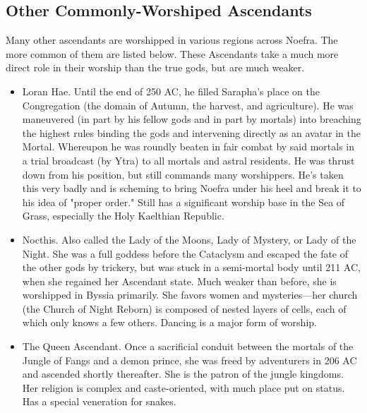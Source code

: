 \subsection{Other Commonly-Worshiped Ascendants}
Many other ascendants are worshipped in various regions across Noefra. The more common of them are listed below. These Ascendants take a much more direct role in their worship than the true gods, but are much weaker.
\begin{itemize}
	\item Loran Hae. Until the end of 250 AC, he filled Sarapha's place on the Congregation (the domain of Autumn, the harvest, and agriculture). He was maneuvered (in part by his fellow gods and in part by mortals) into breaching the highest rules binding the gods and intervening directly as an avatar in the Mortal. Whereupon he was roundly beaten in fair combat by said mortals in a trial broadcast (by Ytra) to all mortals and astral residents. He was thrust down from his position, but still commands many worshippers. He's taken this very badly and is scheming to bring Noefra under his heel and break it to his idea of "proper order." Still has a significant worship base in the Sea of Grass, especially the Holy Kaelthian Republic.
	\item Nocthis. Also called the Lady of the Moons, Lady of Mystery, or Lady of the Night. She was a full goddess before the Cataclysm and escaped the fate of the other gods by trickery, but was stuck in a semi-mortal body until 211 AC, when she regained her Ascendant state. Much weaker than before, she is worshipped in Byssia primarily. She favors women and mysteries---her church (the Church of Night Reborn) is composed of nested layers of cells, each of which only knows a few others. Dancing is a major form of worship.
	\item The Queen Ascendant. Once a sacrificial conduit between the mortals of the Jungle of Fangs and a demon prince, she was freed by adventurers in 206 AC and ascended shortly thereafter. She is the patron of the jungle kingdoms. Her religion is complex and caste-oriented, with much place put on status. Has a special veneration for snakes.
\end{itemize}

